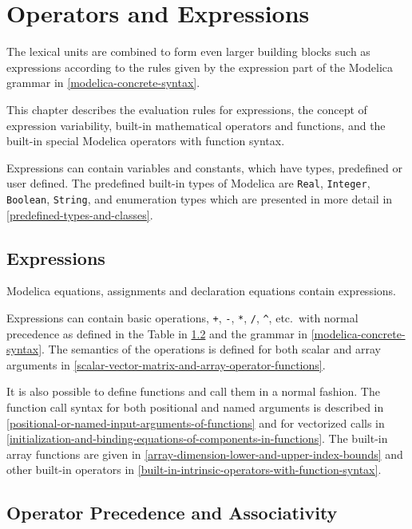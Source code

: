 \chapter{Operators and Expressions}\label{operators-and-expressions}

The lexical units are combined to form even larger building blocks such
as expressions according to the rules given by the expression part of
the Modelica grammar in \cref{modelica-concrete-syntax}.

This chapter describes the evaluation rules for expressions, the concept
of expression variability, built-in mathematical operators and
functions, and the built-in special Modelica operators with function
syntax.

Expressions can contain variables and constants, which have types,
predefined or user defined. The predefined built-in types of Modelica
are \lstinline!Real!, \lstinline!Integer!, \lstinline!Boolean!, \lstinline!String!, and enumeration types which are
presented in more detail in \cref{predefined-types-and-classes}.

\section{Expressions}\label{expressions}

Modelica equations, assignments and declaration equations contain
expressions.

Expressions can contain basic operations, \lstinline!+!, \lstinline!-!, \lstinline!*!, \lstinline!/!, \lstinline!^!, etc.\ with
normal precedence as defined in the Table in \cref{operator-precedence-and-associativity} and the grammar
in \cref{modelica-concrete-syntax}. The semantics of the operations is defined for both
scalar and array arguments in \cref{scalar-vector-matrix-and-array-operator-functions}.

It is also possible to define functions and call them in a normal
fashion. The function call syntax for both positional and named
arguments is described in \cref{positional-or-named-input-arguments-of-functions} and for vectorized calls in
\cref{initialization-and-binding-equations-of-components-in-functions}. The built-in array functions are given in \cref{array-dimension-lower-and-upper-index-bounds}
and other built-in operators in \cref{built-in-intrinsic-operators-with-function-syntax}.

\section{Operator Precedence and Associativity}\label{operator-precedence-and-associativity}

